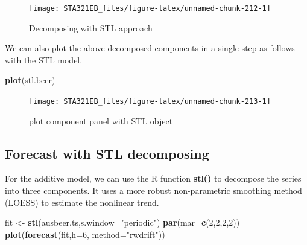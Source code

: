 \documentclass[
]{book}
\newenvironment{Shaded}{\begin{snugshade}}{\end{snugshade}}
\newcommand{\AttributeTok}[1]{\textcolor[rgb]{0.13,0.29,0.53}{#1}}
\newcommand{\DecValTok}[1]{\textcolor[rgb]{0.00,0.00,0.81}{#1}}
\newcommand{\FunctionTok}[1]{\textcolor[rgb]{0.13,0.29,0.53}{\textbf{#1}}}
\newcommand{\NormalTok}[1]{#1}
\newcommand{\OtherTok}[1]{\textcolor[rgb]{0.56,0.35,0.01}{#1}}
\newcommand{\StringTok}[1]{\textcolor[rgb]{0.31,0.60,0.02}{#1}}
\begin{document}
\begin{figure}

{\centering \texttt{[image: STA321EB\_files/figure-latex/unnamed-chunk-212-1]} 

}

\caption{Decomposing with STL approach}\label{fig:unnamed-chunk-212}
\end{figure}

We can also plot the above-decomposed components in a single step as follows with the STL model.

\begin{Shaded}
\begin{Highlighting}[]
\FunctionTok{plot}\NormalTok{(stl.beer)}
\end{Highlighting}
\end{Shaded}

\begin{figure}

{\centering \texttt{[image: STA321EB\_files/figure-latex/unnamed-chunk-213-1]} 

}

\caption{plot component panel with STL object}\label{fig:unnamed-chunk-213}
\end{figure}

\hypertarget{forecast-with-stl-decomposing}{%
\subsection{Forecast with STL decomposing}\label{forecast-with-stl-decomposing}}

For the additive model, we can use the R function \textbf{stl()} to decompose the series into three components. It uses a more robust non-parametric smoothing method (LOESS) to estimate the nonlinear trend.

\begin{Shaded}
\begin{Highlighting}[]
\NormalTok{fit }\OtherTok{\textless{}{-}} \FunctionTok{stl}\NormalTok{(ausbeer.ts,}\AttributeTok{s.window=}\StringTok{"periodic"}\NormalTok{)}
\FunctionTok{par}\NormalTok{(}\AttributeTok{mar=}\FunctionTok{c}\NormalTok{(}\DecValTok{2}\NormalTok{,}\DecValTok{2}\NormalTok{,}\DecValTok{2}\NormalTok{,}\DecValTok{2}\NormalTok{))}
\FunctionTok{plot}\NormalTok{(}\FunctionTok{forecast}\NormalTok{(fit,}\AttributeTok{h=}\DecValTok{6}\NormalTok{, }\AttributeTok{method=}\StringTok{"rwdrift"}\NormalTok{))}
\end{Highlighting}
\end{Shaded}
\end{document}
